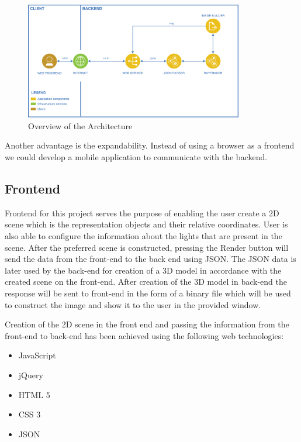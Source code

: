 \documentclass[10pt]{scrartcl}
\begin{document}
 \begin{figure}[h]
  \centering
  \includegraphics[width=0.85\textwidth]{images/architecture.pdf}
  \caption{Overview of the Architecture} 
  \label{fig:architecture} 
\end{figure}

Another advantage is the expandability. Instead of using a browser as a frontend we could develop a mobile application to communicate with the backend.

\subsection{Frontend}

Frontend for this project serves the purpose of enabling the user create a 2D scene which is the representation objects and their relative coordinates. User is also able to configure the information about the lights that are present in the scene. After the preferred scene is constructed, pressing the Render button will send the data from the front-end to the back end using JSON. The JSON data is later used by the back-end for creation of a 3D model in accordance with the created scene on the front-end. After creation of the 3D model in back-end the response will be sent to front-end in the form of a binary file which will be used to construct the image and show it to the user in the provided window. \par

Creation of the 2D scene in the front end and passing the information from the front-end to back-end has been achieved using the following web technologies:
\begin{itemize}
    \item JavaScript
    \item jQuery
    \item HTML 5
    \item CSS 3
    \item JSON
\end{itemize}
\end{document}
